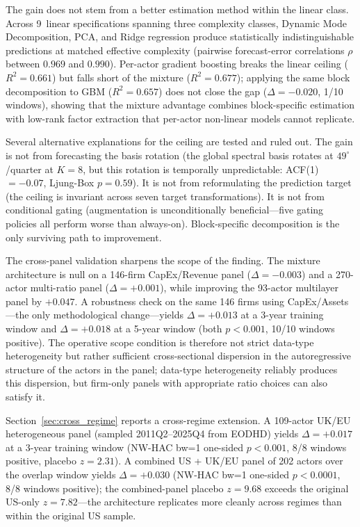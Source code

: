 \documentclass[11pt,a4paper]{article}
\begin{document}
The gain does not stem from a better estimation method within the linear class. Across 9~linear specifications spanning three complexity classes, Dynamic Mode Decomposition, PCA, and Ridge regression produce statistically indistinguishable predictions at matched effective complexity (pairwise forecast-error correlations $\rho$ between $0.969$ and $0.990$). Per-actor gradient boosting breaks the linear ceiling ($R^2 = 0.661$) but falls short of the mixture ($R^2 = 0.677$); applying the same block decomposition to GBM ($R^2 = 0.657$) does not close the gap ($\Delta = -0.020$, 1/10 windows), showing that the mixture advantage combines block-specific estimation with low-rank factor extraction that per-actor non-linear models cannot replicate.

Several alternative explanations for the ceiling are tested and ruled out. The gain is not from forecasting the basis rotation (the global spectral basis rotates at $49^\circ$/quarter at $K{=}8$, but this rotation is temporally unpredictable: ACF(1) $= -0.07$, Ljung-Box $p = 0.59$). It is not from reformulating the prediction target (the ceiling is invariant across seven target transformations). It is not from conditional gating (augmentation is unconditionally beneficial---five gating policies all perform worse than always-on). Block-specific decomposition is the only surviving path to improvement.

The cross-panel validation sharpens the scope of the finding. The mixture architecture is null on a 146-firm CapEx/Revenue panel ($\Delta = -0.003$) and a 270-actor multi-ratio panel ($\Delta = +0.001$), while improving the 93-actor multilayer panel by $+0.047$. A robustness check on the same 146 firms using CapEx/Assets---the only methodological change---yields $\Delta = +0.013$ at a 3-year training window and $\Delta = +0.018$ at a 5-year window (both $p < 0.001$, 10/10 windows positive). The operative scope condition is therefore not strict data-type heterogeneity but rather sufficient cross-sectional dispersion in the autoregressive structure of the actors in the panel; data-type heterogeneity reliably produces this dispersion, but firm-only panels with appropriate ratio choices can also satisfy it.

Section~\ref{sec:cross_regime} reports a cross-regime extension. A 109-actor UK/EU heterogeneous panel (sampled 2011Q2--2025Q4 from EODHD) yields $\Delta = +0.017$ at a 3-year training window (NW-HAC bw=1 one-sided $p < 0.001$, 8/8 windows positive, placebo $z = 2.31$). A combined US + UK/EU panel of 202 actors over the overlap window yields $\Delta = +0.030$ (NW-HAC bw=1 one-sided $p < 0.0001$, 8/8 windows positive); the combined-panel placebo $z = 9.68$ exceeds the original US-only $z = 7.82$---the architecture replicates more cleanly across regimes than within the original US sample.
\end{document}
